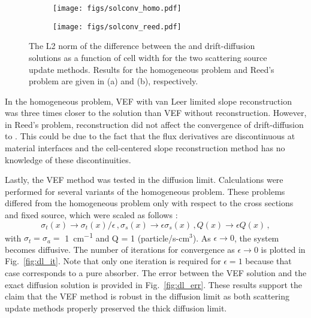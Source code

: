 	\begin{figure}[htb]
		\centering
		\begin{subfigure}{.5\textwidth}
			\centering
			\texttt{[image: figs/solconv\_homo.pdf]}
			\caption{}
			\label{fig:homo}
		\end{subfigure}
		\hspace{-2em}
		\begin{subfigure}{.5\textwidth}
			\centering
			\texttt{[image: figs/solconv\_reed.pdf]}
			\caption{}
			\label{fig:reed}
		\end{subfigure}
		\caption{The L2 norm of the difference between the \SN and drift-diffusion solutions as a function of cell width for the two scattering source update methods. Results for the homogeneous problem and Reed's problem are given in (a) and (b), respectively.}
	\end{figure}

In the homogeneous problem, VEF with van Leer limited slope reconstruction was three times closer to the \SN solution than VEF without reconstruction. However, in Reed's problem, reconstruction did not affect the convergence of drift-diffusion to \SN. This could be due to the fact that the flux derivatives are discontinuous at material interfaces and the cell-centered slope reconstruction method has no knowledge of these discontinuities. 

Lastly, the VEF method was tested in the diffusion limit. Calculations were performed for several variants of the homogeneous problem. 
These problems differed from the homogeneous problem only with respect to the cross sections and fixed source, which were scaled as follows \cite{diflim}: 
	\begin{subequations} \label{res:scaling}
		\begin{equation} 
			\sigma_t(x) \rightarrow \sigma_t(x)/\epsilon \,, 
		\end{equation}
		\begin{equation}
			\sigma_s(x) \rightarrow \epsilon \sigma_s(x) \,,
		\end{equation}
		\begin{equation}
			Q(x) \rightarrow \epsilon Q(x) \,, 
		\end{equation}
	\end{subequations}
with $\sigma_t=\sigma_a=$ \SI{1}{cm^{-1}} and Q = 1 (particle/s-cm$^3$).  As $\epsilon \rightarrow 0$, the system becomes diffusive. The number of iterations for convergence as $\epsilon \rightarrow 0$ is plotted in Fig.~\ref{fig:dl_it}.  Note that only one iteration 
is required for $\epsilon=1$ because that case corresponds to a pure absorber.  The error between the VEF solution and the exact diffusion solution is provided in Fig.~\ref{fig:dl_err}. These results support the claim that the VEF method is robust in the diffusion limit as both scattering update methods properly preserved the thick diffusion limit. 
	
